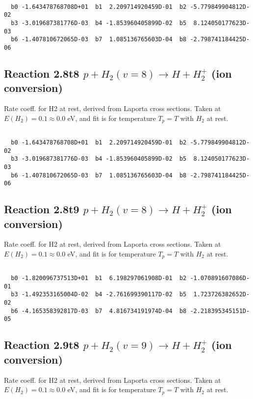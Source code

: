 \begin{small}\begin{verbatim}

  b0 -1.643478768708D+01  b1  2.209714920459D-01  b2 -5.779849904812D-02
  b3 -3.019687381776D-03  b4 -1.853960405899D-02  b5  8.124050177623D-03
  b6 -1.407810672065D-03  b7  1.085136765603D-04  b8 -2.798741184425D-06

\end{verbatim}\end{small}

\newpage
\subsection{
Reaction 2.8t8
$ p + H_2(v=8) \rightarrow H + H_2^+$ (ion conversion)
}
Rate coeff. for H2 at rest, derived from Laporta cross sections.
Taken at $E(H_2) = 0.1 \approx 0.0$ eV,  and fit is for temperature $T_p=T$ with $H_2$ at rest.

\begin{small}\begin{verbatim}

  b0 -1.643478768708D+01  b1  2.209714920459D-01  b2 -5.779849904812D-02
  b3 -3.019687381776D-03  b4 -1.853960405899D-02  b5  8.124050177623D-03
  b6 -1.407810672065D-03  b7  1.085136765603D-04  b8 -2.798741184425D-06

\end{verbatim}\end{small}

\newpage
\subsection{
Reaction 2.8t9
$ p + H_2(v=8) \rightarrow H + H_2^+$ (ion conversion)
}
Rate coeff. for H2 at rest, derived from Laporta cross sections.
Taken at $E(H_2) = 0.1 \approx 0.0$ eV,  and fit is for temperature $T_p=T$ with $H_2$ at rest.

\begin{small}\begin{verbatim}

  b0 -1.820096737513D+01  b1  6.198297061908D-01  b2 -1.070891607086D-01
  b3 -1.492353165004D-02  b4 -2.761699390117D-02  b5  1.723726382652D-02
  b6 -4.165358392817D-03  b7  4.816734191974D-04  b8 -2.218395345151D-05

\end{verbatim}\end{small}

\newpage
\subsection{
Reaction 2.9t8
$ p + H_2(v=9) \rightarrow H + H_2^+$ (ion conversion)
}
Rate coeff. for H2 at rest, derived from Laporta cross sections.
Taken at $E(H_2) = 0.1 \approx 0.0$ eV,  and fit is for temperature $T_p=T$ with $H_2$ at rest.

